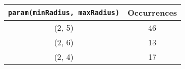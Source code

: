 \documentclass[letterpaper, 12pt]{article}
\begin{document}
\begin{longtable}{|c|c|}
\hline
\textbf{\texttt{param(minRadius, maxRadius)}} & \textbf{Occurrences} \\
\hline
(2, 5) & 46 \\
\hline
(2, 6) & 13 \\
\hline
(2, 4) & 17 \\
\hline
\end{longtable}
\end{document}
